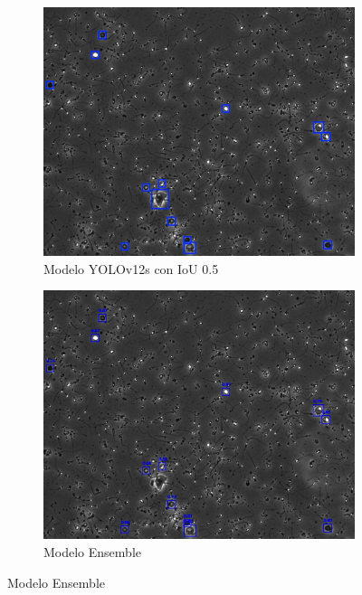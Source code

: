 \documentclass[12pt,a4paper,onecolumn,oneside]{report}
\begin{document}
\begin{figure}[H]
  \vspace{0.3cm} 
  
  \begin{subfigure}[b]{0.48\textwidth}
    \centering
    \includegraphics[width=\textwidth]{figuras/evaluacion_cualitativa/347/347_v12.jpg}
    \caption{Modelo YOLOv12s con IoU 0.5}
    \label{fig:yolov12s_IoU0.5_image_347}
  \end{subfigure}
  \hfill
  \begin{subfigure}[b]{0.48\textwidth}
    \centering
    \includegraphics[width=\textwidth]{figuras/evaluacion_cualitativa/347/347_ensemble.jpg}
    \caption{Modelo Ensemble}
    \label{fig:ensemble_image_347}
  \end{subfigure}


\end{figure}
\end{document}
